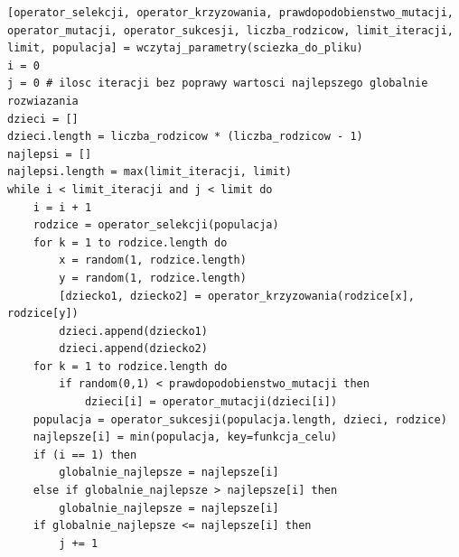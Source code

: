 \documentclass[12pt]{article}
\begin{document}
\begin{lstlisting}[caption={Pseudokod głównego programu}]
[operator_selekcji, operator_krzyzowania, prawdopodobienstwo_mutacji, operator_mutacji, operator_sukcesji, liczba_rodzicow, limit_iteracji, limit, populacja] = wczytaj_parametry(sciezka_do_pliku)
i = 0
j = 0 # ilosc iteracji bez poprawy wartosci najlepszego globalnie rozwiazania
dzieci = []
dzieci.length = liczba_rodzicow * (liczba_rodzicow - 1)
najlepsi = []
najlepsi.length = max(limit_iteracji, limit)
while i < limit_iteracji and j < limit do
	i = i + 1
	rodzice = operator_selekcji(populacja)
	for k = 1 to rodzice.length do
		x = random(1, rodzice.length)
		y = random(1, rodzice.length)
		[dziecko1, dziecko2] = operator_krzyzowania(rodzice[x], rodzice[y])
		dzieci.append(dziecko1)
		dzieci.append(dziecko2)
	for k = 1 to rodzice.length do
		if random(0,1) < prawdopodobienstwo_mutacji then
			dzieci[i] = operator_mutacji(dzieci[i])
	populacja = operator_sukcesji(populacja.length, dzieci, rodzice)
	najlepsze[i] = min(populacja, key=funkcja_celu)
	if (i == 1) then
		globalnie_najlepsze = najlepsze[i]
	else if globalnie_najlepsze > najlepsze[i] then
		globalnie_najlepsze = najlepsze[i]
	if globalnie_najlepsze <= najlepsze[i] then
		j += 1
\end{lstlisting}
\end{document}
